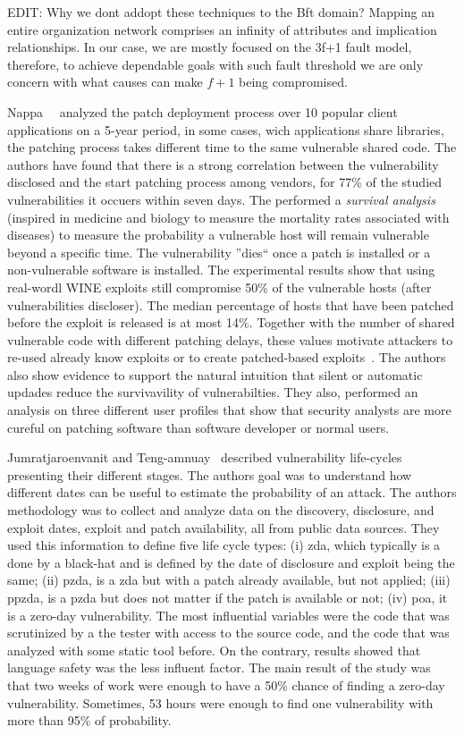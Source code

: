 EDIT: Why we dont addopt these techniques to the Bft domain? Mapping an entire organization network comprises an infinity of attributes and implication relationships.
In our case, we are mostly focused on the 3f+1 fault model, therefore, to achieve dependable goals with such fault threshold we are only concern with what causes can make $f+1$ being compromised.


Nappa~\etal{}~\cite{Nappa:2015} analyzed the patch deployment process over 10 popular client applications on a 5-year period, in some cases, wich applications share libraries, the patching process takes different time to the same vulnerable shared code. 
The authors have found that there is a strong correlation between the vulnerability disclosed and the start patching process among vendors, for 77\% of the studied vulnerabilities it occuers within seven days. 
The performed a \emph{survival analysis} (inspired in medicine and biology to measure the mortality rates associated with diseases) to measure the probability a vulnerable host will remain vulnerable beyond a specific time.
The vulnerability ''dies`` once a patch is installed or a non-vulnerable software is installed.
The experimental results show that using real-wordl WINE exploits still compromise 50\% of the vulnerable hosts (after vulnerabilities discloser). 
The median percentage of hosts that have been patched before the exploit is released is at most 14\%.
Together with the number of shared vulnerable code with different patching delays, these values motivate attackers to re-used already know exploits or to create patched-based exploits~\cite{Brumley:2008}.
The authors also show evidence to support the natural intuition that silent or automatic updades reduce the survivavility of vulnerabilties. 
They also, performed an analysis on three different user profiles that show that security analysts are more cureful on patching software than software developer or normal users.

Jumratjaroenvanit and Teng-amnuay~\cite{Jumratjaroenvanit:2008} described vulnerability life-cycles presenting their different stages. 
The authors goal was to understand how different dates can be useful to estimate the probability of an attack. 
The authors methodology was to collect and analyze data on the discovery, disclosure, and exploit dates, exploit and patch availability, all from public data sources. 
They used this information to define five life cycle types: (i) \gls{zda}, which typically is a done by a black-hat and is defined by the date of disclosure and exploit being the same; (ii) \gls{pzda}, is a \gls{zda} but with a patch already available, but not applied; 
(iii) \gls{ppzda}, is a \gls{pzda} but does not matter if the patch is available or not; 
(iv) \gls{poa}, it is a zero-day vulnerability. 
The most influential variables were the code that was scrutinized by a the tester with access to the source code, and the code that was analyzed with some static tool before. 
On the contrary, results showed that language safety was the less influent factor. 
The main result of the study was that two weeks of work were enough to have a 50\% chance of finding a zero-day vulnerability. 
Sometimes, 53 hours were enough to find one vulnerability with more than 95\% of probability.


